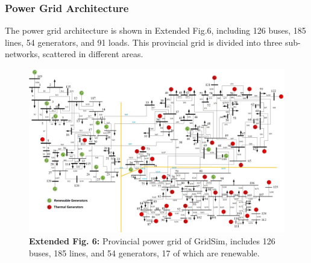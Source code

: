 \subsubsection*{Power Grid Architecture}
The power grid architecture is shown in Extended Fig.6, including 126 buses, 185 lines, 54 generators, and 91 loads. This provincial grid is divided into three sub-networks, scattered in different areas.
\begin{figure}[h]
    \centering
    \includegraphics[width=1.0\linewidth]{fig/SG126.jpg}
    \captionsetup{labelformat=empty}
    \caption{\textbf{Extended Fig. 6:} Provincial power grid of GridSim, includes 126 buses, 185 lines, and 54 generators, 17 of which are renewable.}
    \label{fig:grid_arch}
\end{figure}

